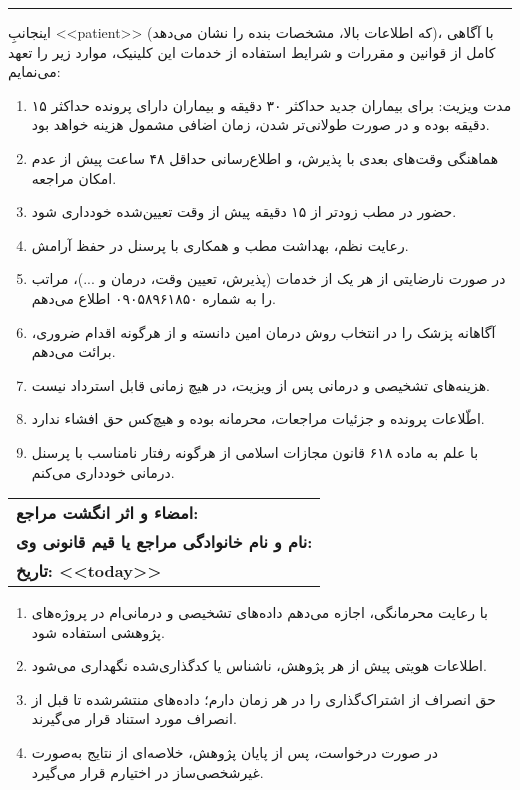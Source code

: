 \documentclass[12pt]{article}
\begin{document}
\hrule


\vspace{0.5cm}

\normalfont
اینجانبِ <<patient>> (که اطلاعات بالا، مشخصات بنده را نشان می‌دهد)، با آگاهی کامل از قوانین و مقررات و شرایط استفاده از خدمات این کلینیک، موارد زیر را تعهد می‌نمایم:

\begin{enumerate}
  \item مدت ویزیت: برای بیماران جدید حداکثر ۳۰ دقیقه و بیماران دارای پرونده حداکثر ۱۵ دقیقه بوده و در صورت طولانی‌تر شدن، زمان اضافی مشمول هزینه خواهد بود.
  \item هماهنگی وقت‌های بعدی با پذیرش، و اطلاع‌رسانی حداقل ۴۸ ساعت پیش از عدم امکان مراجعه.
  \item حضور در مطب زودتر از ۱۵ دقیقه پیش از وقت تعیین‌شده خودداری شود.
  \item رعایت نظم، بهداشت مطب و همکاری با پرسنل در حفظ آرامش.
  \item در صورت نارضایتی از هر یک از خدمات (پذیرش، تعیین وقت، درمان و ...)، مراتب را به شماره ۰۹۰۵۸۹۶۱۸۵۰ اطلاع می‌دهم.
  \item آگاهانه پزشک را در انتخاب روش درمان امین دانسته و از هرگونه اقدام ضروری، برائت می‌دهم.
  \item هزینه‌های تشخیصی و درمانی پس از ویزیت، در هیچ زمانی قابل استرداد نیست.
  \item اطّلاعات پرونده و جزئیات مراجعات، محرمانه بوده و هیچ‌کس حق افشاء ندارد.
  \item با علم به ماده ۶۱۸ قانون مجازات اسلامی از هرگونه رفتار نامناسب با پرسنل درمانی خودداری می‌کنم.
\end{enumerate}



\vspace{2.5cm}
\begin{tabularx}{\textwidth}{X}

  \textbf{امضاء و اثر انگشت مراجع:} \\
  \textbf{نام و نام خانوادگی مراجع یا قیم قانونی وی: }\\
  \textbf{تاریخ: <<today>>}

\end{tabularx}

\newpage

\vspace{2cm}

\large{}
\normalfont \normalsize
\begin{enumerate}
  \item با رعایت محرمانگی، اجازه می‌دهم داده‌های تشخیصی و درمانی‌ام در پروژه‌های پژوهشی استفاده شود.
  \item اطلاعات هویتی پیش از هر پژوهش، ناشناس یا کدگذاری‌شده نگهداری می‌شود.
  \item حق انصراف از اشتراک‌گذاری را در هر زمان دارم؛ داده‌های منتشرشده تا قبل از انصراف مورد استناد قرار می‌گیرند.
  \item در صورت درخواست، پس از پایان پژوهش، خلاصه‌ای از نتایج به‌صورت غیرشخصی‌ساز در اختیارم قرار می‌گیرد.
\end{enumerate}
\end{document}
